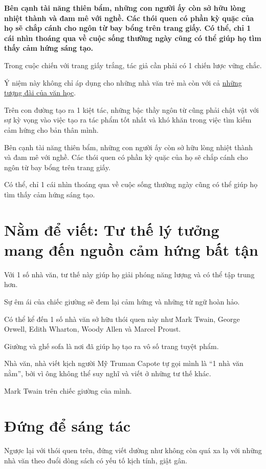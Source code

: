 \documentclass{book}
\numberwithin{equation}{section}
\begin{document}
\textbf{Bên cạnh tài năng thiên bẩm, những con người ấy còn sở hữu lòng nhiệt thành và đam mê với nghề. Các thói quen có phần kỳ quặc của họ sẽ chắp cánh cho ngôn từ bay bổng trên trang giấy. Có thể, chỉ 1 cái nhìn thoáng qua về cuộc sống thường ngày cũng có thể giúp họ tìm thấy cảm hứng sáng tạo.}

%
Trong cuộc chiến với trang giấy trắng, tác giả cần phải có 1 chiến lược vững chắc.

Ý niệm này không chỉ áp dụng cho những nhà văn trẻ mà còn với cả \href{http://tramdoc.vn/tin-tuc/10-tac-pham-kinh-dien-tu-giai-nobel-van-hoc-da-duoc-dich-sang-tieng-viet-nyalW.html}{những tượng đài của văn học}.

Trên con đường tạo ra 1 kiệt tác, những bậc thầy ngôn từ cũng phải chật vật với sự kỳ vọng vào việc tạo ra tác phẩm tốt nhất và khó khăn trong việc tìm kiếm cảm hứng cho bản thân mình.

%
Bên cạnh tài năng thiên bẩm, những con người ấy còn sở hữu lòng nhiệt thành và đam mê với nghề. Các thói quen có phần kỳ quặc của họ sẽ chắp cánh cho ngôn từ bay bổng trên trang giấy.

Có thể, chỉ 1 cái nhìn thoáng qua về cuộc sống thường ngày cũng có thể giúp họ tìm thấy cảm hứng sáng tạo.

\section{Nằm để viết: Tư thế lý tưởng mang đến nguồn cảm hứng bất tận}
Với 1 số nhà văn, tư thế này giúp họ giải phóng năng lượng và có thể tập trung hơn.

Sự êm ái của chiếc giường sẽ đem lại cảm hứng và những từ ngữ hoàn hảo.

Có thể kể đến 1 số nhà văn sở hữu thói quen này như Mark Twain, George Orwell, Edith Wharton, Woody Allen và Marcel Proust.

Giường và ghế sofa là nơi đã giúp họ tạo ra vô số trang tuyệt phẩm.

Nhà văn, nhà viết kịch người Mỹ Truman Capote tự gọi mình là ``1 nhà văn nằm'', bởi vì ông không thể suy nghĩ và viết ở những tư thế khác.

%
\textsf{Mark Twain trên chiếc giường của mình.}

\section{Đứng để sáng tác}
Ngược lại với thói quen trên, đứng viết dường như không còn quá xa lạ với những nhà văn theo đuổi dòng sách có yếu tố kịch tính, giật gân.
\end{document}
